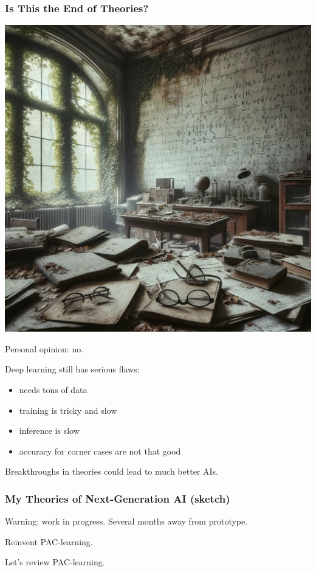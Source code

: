 \documentclass{beamer}   	%
\theoremstyle{definition}
\begin{document}
\begin{frame}
\frametitle{Is This the End of Theories?}
\includegraphics[width=\linewidth]{forgotten_theories.png}
\end{frame}

\begin{frame}
Personal opinion: no.

Deep learning still has serious flaws:
\begin{itemize}
	\item needs tons of data
	\item training is tricky and slow
	\item inference is slow
	\item accuracy for corner cases are not that good
\end{itemize}

Breakthroughs in theories could lead to much better AIs.
\end{frame}

\begin{frame}
\frametitle{My Theories of Next-Generation AI (sketch)}

Warning: work in progress. Several months away from prototype.

Reinvent PAC-learning.

Let's review PAC-learning.
\end{frame}
\end{document}
